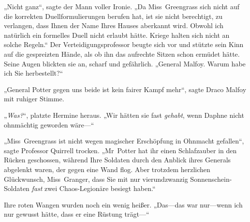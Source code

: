 „Nicht ganz“, sagte der Mann voller Ironie. „Da Miss~Greengrass sich nicht auf die korrekten Duellformulierungen berufen hat, ist sie nicht berechtigt, zu verlangen, dass Ihnen der Name Ihres Hauses aberkannt wird. Obwohl ich natürlich ein formelles Duell nicht erlaubt hätte. Kriege halten sich nicht an solche Regeln.“ Der Verteidigungsprofessor beugte sich vor und stützte sein Kinn auf die gespreizten Hände, als ob ihn das aufrechte Sitzen schon ermüdet hätte. Seine Augen blickten sie an, scharf und gefährlich. „General Malfoy. Warum habe ich Sie herbestellt?“

„General Potter gegen uns beide ist kein fairer Kampf mehr“, sagte Draco Malfoy mit ruhiger Stimme.

„\emph{Was?}“, platzte Hermine heraus. „Wir hätten sie fast \emph{gehabt}, wenn Daphne nicht ohnmächtig geworden wäre—“

„Miss~Greengrass ist nicht wegen magischer Erschöpfung in Ohnmacht gefallen“, sagte Professor Quirrell trocken. „Mr~Potter hat ihr einen Schlafzauber in den Rücken geschossen, während Ihre Soldaten durch den Anblick ihres Generals abgelenkt waren, der gegen eine Wand flog. Aber trotzdem herzlichen Glückwunsch, Miss~Granger, dass Sie mit nur vierundzwanzig Sonnenschein-Soldaten \emph{fast} zwei Chaos-Legionäre besiegt haben.“

Ihre roten Wangen wurden noch ein wenig heißer. „Das—das war nur—wenn ich nur gewusst hätte, dass er eine Rüstung trägt—“

